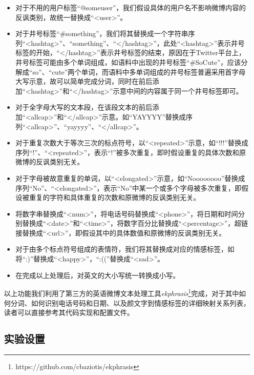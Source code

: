 \begin{itemize}

\item 对于不用的用户标签“@someuser”，我们假设具体的用户名不影响微博内容的反讽类别，故统一替换成“<user>”。

\item 对于井号标签“\#something”，我们将其替换成一个字符串序列“<hashtag>”、“something”、“</hashtag>”，此处“<hashtag>”表示井号标签的开始，“</hashtag>”表示井号标签的结束，原因在于Twitter平台上，井号标签可能由多个单词组成，如语料中出现的井号标签“\#SoCute”，应该分解成“so”、“cute”两个单词，而语料中多单词组成的井号标签普遍采用首字母大写示意，故可以简单完成分词，同时在前后添加“<hashtag>”和“</hashtag>”示意中间的内容属于同一个井号标签即可。

\item 对于全字母大写的文本段，在该段文本的前后添加“<allcap>”和“</allcap>”示意。如“YAYYYY”替换成序列“<allcap>”、“yayyyy”、“</allcap>”。

\item 对于重复次数大于等次三次的标点符号，以“<repeated>”示意，如“!!!”替换成序列“!”、“<repeated>”，表示“!”被多次重复，即时假设重复的具体次数和原微博的反讽类别无关。

\item 对于字母被故意重复的单词，以“<elongated>”示意，如“Noooooooo”替换成序列“No”、“<elongated>”，表示“No”中某一个或多个字母被多次重复，即假设被重复的字符和具体重复的次数和原微博的反讽类别无关。

\item 将数字串替换成“<num>”，将电话号码替换成“<phone>”，将日期和时间分别替换成“<date>”和“<time>”，将数字百分比替换成“<percentage>”，超链接替换成“<url>”，即假设其中的具体数值和原微博的反讽类别无关。

\item 对于由多个标点符号组成的表情符，我们将其替换成对应的情感标签，如将“:)”替换成“<happy>”，“:((”替换成“<sad>”。

\item 在完成以上处理后，对英文的大小写统一转换成小写。

\end{itemize}

以上功能我们利用了第三方的英语微博文本处理工具\textit{ekphrasis}\footnote{https://github.com/cbaziotis/ekphrasis}完成，对于其中如何分词、如何识别电话号码和日期、以及颜文字到情感标签的详细映射关系列表，读者可以直接参考其代码实现和配置文件。

\subsection{实验设置}

